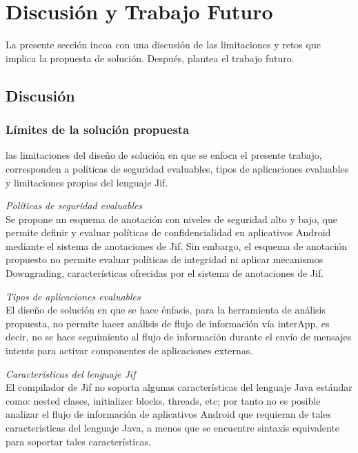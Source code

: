 \section{Discusión y Trabajo Futuro}
\label{discusion}

La presente sección incoa con una discusión de las limitaciones y retos que
implica la propuesta de solución. Después, plantea el trabajo futuro.

\subsection{Discusión}
\subsubsection{Límites de la solución propuesta}
las limitaciones del diseño de solución en que se enfoca el presente trabajo,
corresponden a políticas de seguridad evaluables, tipos de aplicaciones
evaluables y limitaciones propias del lenguaje Jif.

\emph{Políticas de seguridad evaluables}\\
Se propone un esquema de anotación con niveles de seguridad alto y
bajo, que permite definir y evaluar políticas de confidencialidad en aplicativos
Android mediante el sistema de anotaciones de Jif.
Sin embargo, el esquema de anotación propuesto no permite evaluar políticas de
integridad ni aplicar mecanismos Downgrading, características ofrecidas por el
sistema de anotaciones de Jif.

\emph{Tipos de aplicaciones evaluables}\\
El diseño de solución en que se hace énfasis, para la
herramienta de análisis propuesta, no permite hacer análisis de flujo de
información vía interApp, es decir, no se hace seguimiento al flujo de
información durante el envío de mensajes intents para activar componentes de
aplicaciones externas.

\emph{Características del lenguaje Jif}\\
El compilador de Jif no soporta algunas características del lenguaje Java
estándar como: nested clases, initializer blocks, threads, etc; por tanto no es
posible analizar el flujo de información de aplicativos Android que requieran de
tales características del lenguaje Java, a menos que se encuentre sintaxis
equivalente para soportar tales características.\newline 

